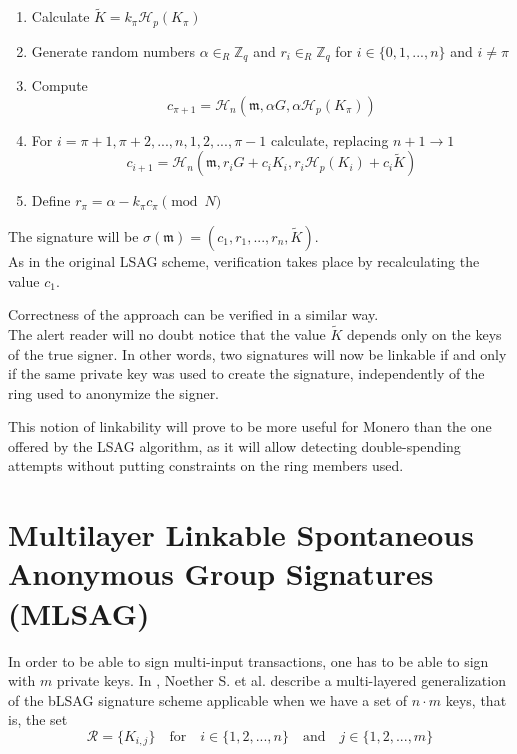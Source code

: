 \begin{enumerate}
	\item Calculate \(\tilde{K} = k_\pi \mathcal{H}_p(K_\pi)\)
	
	\item Generate random numbers \(\alpha \in_R \mathbb{Z}_q\) and  \(r_i \in_R \mathbb{Z}_q\) for \(i \in \{0, 1, ..., n\}\) and \(i \ne \pi\)
	
	\item Compute
	\[c_{\pi+1} = \mathcal{H}_n(\mathfrak{m}, \alpha G, \alpha \mathcal{H}_p(K_\pi))\]
	
	\item For \(i = \pi+1, \pi+2, ..., n, 1, 2, ..., \pi-1\) calculate, replacing \(n + 1 \rightarrow 1\)
	\[  c_{i+1} = \mathcal{H}_n(\mathfrak{m}, r_i G + c_i K_i, r_i \mathcal{H}_p(K_i) + c_i \tilde{K} )  \] 
	
	
	\item Define \(r_\pi = \alpha -k_\pi c_\pi \pmod N\)
	
\end{enumerate}

The signature will be \(\sigma(\mathfrak{m}) = (c_1, r_1, ..., r_n, \tilde{K}) \).
\\

As in the original LSAG scheme, verification takes place by recalculating the value \(c_1\).

Correctness of the approach can be verified in a similar way.
\\

The alert reader will no doubt notice that the value \(\tilde{K} \) depends only on the keys of the true signer.
In other words, two signatures will now be linkable if and only if the same private key was used to create the signature,
independently of the ring used to anonymize the signer. 

This notion of linkability will prove to be more useful for Monero than the one offered by the LSAG algorithm, as it
will allow detecting double-spending attempts without putting constraints on the ring members used.



\section{Multilayer Linkable Spontaneous Anonymous Group Signatures (MLSAG)}
\label{sec:MLSAG}

In order to be able to sign multi-input transactions, one has to be able to sign with
\(m\) private keys. In \cite{cryptoeprint:2015:1098, ledger34}, Noether S. et al. describe a multi-layered generalization of the bLSAG signature scheme applicable when we have a set of \(n \cdot m\) keys, that is, the set
\[\mathcal{R} = \{ K_{i,j} \}  \quad \textrm{for} \quad  i \in \{1, 2, ..., n\} \quad \textrm{and} \quad j \in \{1, 2, ..., m\}\] 

